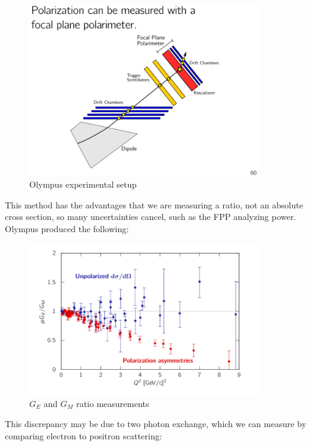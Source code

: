                   
            \begin{figure}[H]
                \centering
                \includegraphics[width=10cm]{Chapters/Ch1-Intro/Ch1-Sec1-Background/pics/elastic-ep/olympus-fpp.PNG}
                \caption{Olympus experimental setup}
            \end{figure}
            
            This method has the advantages that we are measuring a ratio, not an absolute cross section, so many uncertainties cancel, such as the FPP analyzing power. Olympus produced the following:
            
                  
            \begin{figure}[H]
                \centering
                \includegraphics[width=10cm]{Chapters/Ch1-Intro/Ch1-Sec1-Background/pics/elastic-ep/olympus-form-factors.PNG}
                \caption{$G_E$ and $G_M$ ratio measurements}
            \end{figure}
            
            This discrepancy may be due to two photon exchange, which we can measure by comparing electron to positron scattering:
            

